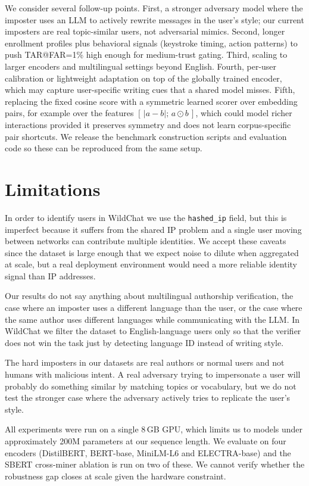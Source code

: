 \documentclass[11pt]{article}
\begin{document}
We consider several follow-up points. First, a stronger adversary model where the imposter uses an LLM to actively rewrite messages in the user's style; our current imposters are real topic-similar users, not adversarial mimics. Second, longer enrollment profiles plus behavioral signals (keystroke timing, action patterns) to push TAR@FAR=1\% high enough for medium-trust gating. Third, scaling to larger encoders and multilingual settings beyond English. Fourth, per-user calibration or lightweight adaptation on top of the globally trained encoder, which may capture user-specific writing cues that a shared model misses. Fifth, replacing the fixed cosine score with a symmetric learned scorer over embedding pairs, for example over the features $[\,|a-b|;\,a\odot b\,]$, which could model richer interactions provided it preserves symmetry and does not learn corpus-specific pair shortcuts. We release the benchmark construction scripts and evaluation code so these can be reproduced from the same setup.

\section*{Limitations}

In order to identify users in WildChat we use the \texttt{hashed\_ip} field, but this is imperfect because it suffers from the shared IP problem and a single user moving between networks can contribute multiple identities. We accept these caveats since the dataset is large enough that we expect noise to dilute when aggregated at scale, but a real deployment environment would need a more reliable identity signal than IP addresses.

Our results do not say anything about multilingual authorship verification, the case where an imposter uses a different language than the user, or the case where the same author uses different languages while communicating with the LLM. In WildChat we filter the dataset to English-language users only so that the verifier does not win the task just by detecting language ID instead of writing style.

The hard imposters in our datasets are real authors or normal users and not humans with malicious intent. A real adversary trying to impersonate a user will probably do something similar by matching topics or vocabulary, but we do not test the stronger case where the adversary actively tries to replicate the user's style.

All experiments were run on a single 8\,GB GPU, which limits us to models under approximately 200M parameters at our sequence length. We evaluate on four encoders (DistilBERT, BERT-base, MiniLM-L6 and ELECTRA-base) and the SBERT cross-miner ablation is run on two of these. We cannot verify whether the robustness gap closes at scale given the hardware constraint.
\end{document}

